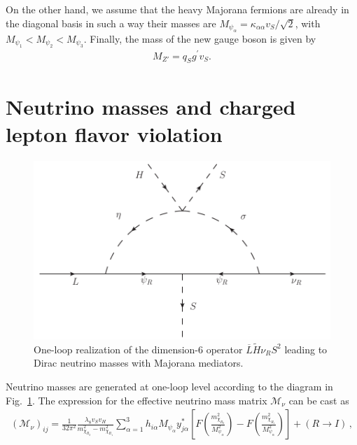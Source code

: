 \documentclass[12pt]{article}
\begin{document}
On the other hand, we assume that the heavy Majorana fermions are already in the diagonal basis in such a way their masses are $M_{\psi_\alpha}=\kappa_{\alpha\alpha}v_S/\sqrt{2}$, with $M_{\psi_1}<M_{\psi_2}<M_{\psi_3}$. Finally, the mass of the new gauge boson is given by 
\begin{align}
    M_{Z'}=q_Sg^{\prime} v_S.
\end{align}

\section{Neutrino masses and charged lepton flavor violation}
\label{sec:Neutrinos}
%
\begin{figure}
\centering
\includegraphics[scale=0.6]{Neutrino_Loop.pdf}
\caption{One-loop realization of the dimension-6 operator $\overline{L} \tilde{H} \nu_R S^2$ leading to Dirac neutrino masses with Majorana mediators.}
\label{fig:zee}
\end{figure}
%
Neutrino masses are generated at one-loop level according to the diagram in  Fig.~\ref{fig:zee}. The expression for the effective neutrino mass matrix $\mathcal{M}_{\nu}$ can be cast as
%
\begin{align}
(\mathcal{M}_{\nu})_{ij} = \frac{1}{32 \pi^{2}}  \frac{\lambda_8 v_S v_H} {m_{\chi_{R_2}}^{2}-m_{\chi_{R_1}}^{2}}\sum_{\alpha=1}^{3} h_{i \alpha} M_{\psi_\alpha} y^{*}_{j\alpha}\left[ F\left( \frac{m_{\chi_{R_2}}^{2}}{M_{\psi_{\alpha}}^{2}} \right) - F\left( \frac{m_{\chi_{R_1}}^{2}}{M_{\psi_{\alpha}}^{2}} \right) \right] + (R \to I)\,,
\end{align}
\end{document}

